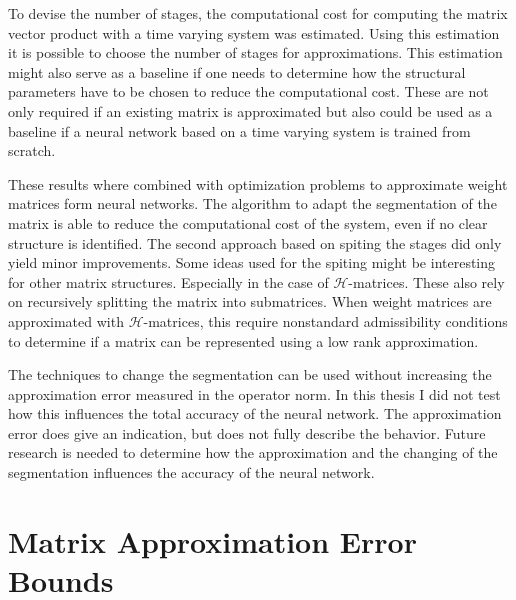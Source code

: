 \documentclass[doctype=mastersthesis,BCOR=15mm,biblatex]{ldvbook}%
\begin{document}
To devise the number of stages, the computational cost for computing the matrix vector product with a time varying system was estimated.
Using this estimation it is possible to choose the number of stages for approximations.
This estimation might also serve as a baseline if one needs to determine how the structural parameters have to be chosen to reduce the computational cost.
These are not only required if an existing matrix is approximated but also could be used as a baseline if a neural network based on a time varying system is trained from scratch.

These results where combined with optimization problems to approximate weight matrices form neural networks.
The algorithm to adapt the segmentation of the matrix is able to reduce the computational cost of the system, even if no clear structure is identified.
The second approach based on spiting the stages did only yield minor improvements.
Some ideas used for the spiting might be interesting for other matrix structures.
Especially in the case of $\mathcal{H}$-matrices.
These also rely on recursively splitting the matrix into submatrices.
When weight matrices are approximated with $\mathcal{H}$-matrices, this require nonstandard admissibility conditions to determine if a matrix can be represented using a low rank approximation.

The techniques to change the segmentation can be used without increasing the approximation error measured in the operator norm.
In this thesis I did not test how this influences the total accuracy of the neural network. 
The approximation error does give an indication, but does not fully describe the behavior.
Future research is needed to determine how the approximation and the changing of the segmentation influences the accuracy of the neural network.

\appendix
\chapter{Matrix Approximation Error Bounds}\label{A:Error Bounds}
\end{document}
